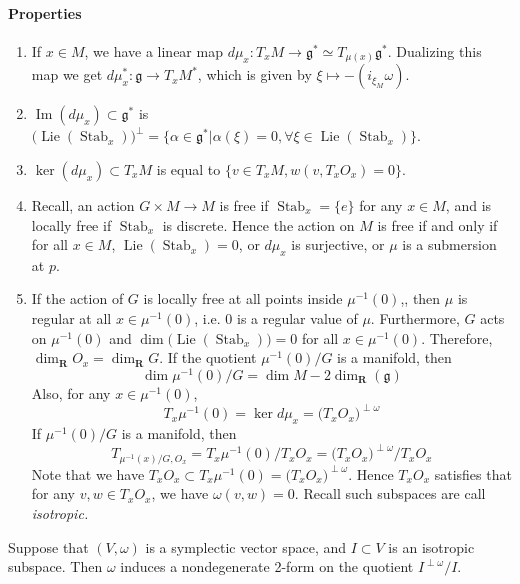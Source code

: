 \documentclass[
11pt, %
letterpaper， %
oneside, %
headinclude,footinclude, %
BCOR5mm, %
]{scrartcl}
\newcommand{\R}{{\mathbf{R}}}
\newcommand{\im}{\operatorname{Im}}
\newcommand{\lie}{\operatorname{Lie}}
\newcommand{\stab}{\operatorname{Stab}}
\begin{document}
\paragraph{Properties}
\begin{enumerate}
	\item If $x\in M$, we have a linear map $d\mu_x:T_x M \to \mathfrak{g}^*\simeq T_{\mu(x)}\mathfrak{g}^*$. Dualizing this map we get $d\mu_x^*: \mathfrak{g} \to T_xM^*$, which is given by $\xi \mapsto -(i_{\xi_M}\omega)$.
	\item $\im (d\mu_x)\subset \mathfrak{g}^*$ is $\big(\lie (\stab_x) \big)^{\perp}=\{\alpha\in \mathfrak{g}^*| \alpha(\xi)=0, \forall \xi \in \lie(\stab_x) \}$.
	
	\item $\ker (d\mu_x) \subset T_x M$ is equal to $\{v\in T_xM, w(v, T_{x}O_x)=0 \}$.
	\item Recall, an action $G\times M \to M$ is free if $\stab_x=\{e\}$ for any $x\in M$, and is locally free if $\stab_x$ is discrete. Hence the action on $M$ is free if and only if for all $x\in M$, $\lie(\stab_x)=0$, or $d\mu_x$ is surjective, or $\mu$ is a submersion at $p$.
	\item If the action of $G$ is locally free at all points inside $\mu^{-1}(0)$,, then $\mu$ is regular at all $x\in \mu^{-1}(0)$, i.e. $0$ is a regular value of $\mu$. Furthermore, $G$ acts on $\mu^{-1}(0)$ and $\dim\big(\lie(\stab_x) \big)=0$ for all $x\in \mu^{-1}(0)$. Therefore, $\dim_{\R}O_x=\dim_{\R} G$. If the quotient $\mu^{-1}(0)/G$ is a manifold, then $$\dim \mu^{-1}(0)/G=\dim M-2\dim_{\R}(\mathfrak{g})$$ Also, for any $x\in \mu^{-1}(0)$,
	\begin{equation*}
	T_x \mu^{-1}(0)=\ker d\mu_x=\big(T_xO_x\big)^{\perp \omega}
	\end{equation*}
		If $\mu^{-1}(0)/G$ is a manifold, then
		\begin{equation*}
		T_{\mu^{-1}(x)/G, O_x}= T_x\mu^{-1}(0)/T_xO_x=\big(T_xO_x\big)^{\perp \omega}/T_xO_x
		\end{equation*}
		Note that we have $T_x O_x\subset T_x \mu^{-1}(0)=\big(T_xO_x\big)^{\perp \omega}$. Hence $T_xO_x$ satisfies that for any $v, w\in T_x O_x$, we have $\omega(v,w)=0$. Recall such subspaces are call \itshape{isotropic}.
\end{enumerate}

\begin{lem}
	Suppose that $(V, \omega)$ is a symplectic vector space, and $I\subset V$ is an isotropic subspace. Then $\omega$ induces a nondegenerate 2-form on the quotient $I^{\perp \omega}/I$.
\end{lem}
\end{document}
